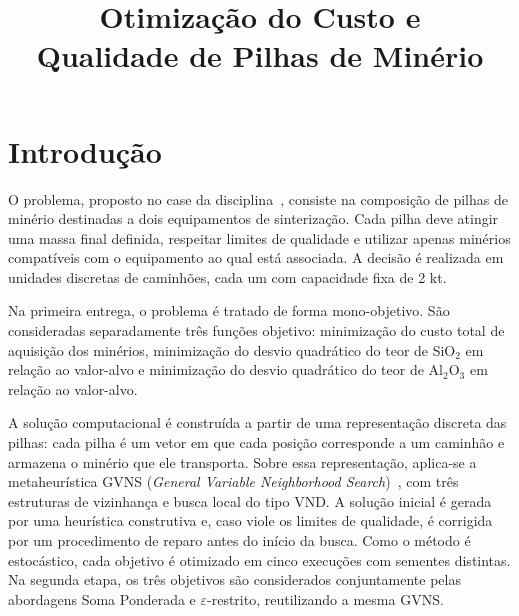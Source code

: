 \documentclass[conference]{IEEEtran}
\begin{document}
\title{Otimização do Custo e \\Qualidade de Pilhas de Minério}

\author{
}

\maketitle

\section{Introdução}

O problema, proposto no case da disciplina~\cite{case_cassotis}, consiste na composição de pilhas de minério destinadas a dois equipamentos de sinterização. Cada pilha deve atingir uma massa final definida, respeitar limites de qualidade e utilizar apenas minérios compatíveis com o equipamento ao qual está associada. A decisão é realizada em unidades discretas de caminhões, cada um com capacidade fixa de 2 kt.

Na primeira entrega, o problema é tratado de forma mono-objetivo. São consideradas separadamente três funções objetivo: minimização do custo total de aquisição dos minérios, minimização do desvio quadrático do teor de SiO$_2$ em relação ao valor-alvo e minimização do desvio quadrático do teor de Al$_2$O$_3$ em relação ao valor-alvo.

A solução computacional é construída a partir de uma representação discreta das pilhas: cada pilha é um vetor em que cada posição corresponde a um caminhão e armazena o minério que ele transporta. Sobre essa representação, aplica-se a metaheurística GVNS (\textit{General Variable Neighborhood Search})~\cite{aula02}, com três estruturas de vizinhança e busca local do tipo VND. A solução inicial é gerada por uma heurística construtiva e, caso viole os limites de qualidade, é corrigida por um procedimento de reparo antes do início da busca. Como o método é estocástico, cada objetivo é otimizado em cinco execuções com sementes distintas. Na segunda etapa, os três objetivos são considerados conjuntamente pelas abordagens Soma Ponderada e $\varepsilon$-restrito, reutilizando a mesma GVNS.
\end{document}
